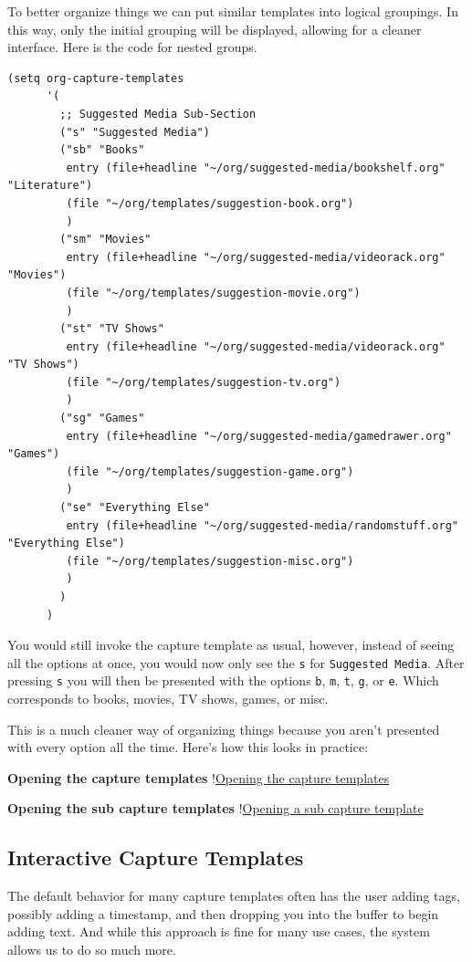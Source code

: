 \documentclass[11pt]{article}
\begin{document}
To better organize things we can put similar templates into logical groupings. In this way, only the initial grouping will be displayed, allowing for a cleaner interface. Here is the code for nested groups.

\begin{verbatim}
(setq org-capture-templates
      '(
        ;; Suggested Media Sub-Section
        ("s" "Suggested Media")
        ("sb" "Books"
         entry (file+headline "~/org/suggested-media/bookshelf.org" "Literature")
         (file "~/org/templates/suggestion-book.org")
         )
        ("sm" "Movies"
         entry (file+headline "~/org/suggested-media/videorack.org" "Movies")
         (file "~/org/templates/suggestion-movie.org")
         )
        ("st" "TV Shows"
         entry (file+headline "~/org/suggested-media/videorack.org" "TV Shows")
         (file "~/org/templates/suggestion-tv.org")
         )
        ("sg" "Games"
         entry (file+headline "~/org/suggested-media/gamedrawer.org" "Games")
         (file "~/org/templates/suggestion-game.org")
         )
        ("se" "Everything Else"
         entry (file+headline "~/org/suggested-media/randomstuff.org" "Everything Else")
         (file "~/org/templates/suggestion-misc.org")
         )
        )
      )
\end{verbatim}

You would still invoke the capture template as usual, however, instead of seeing all the options at once, you would now only see the \texttt{s} for \texttt{Suggested Media}. After pressing \texttt{s} you will then be presented with the options \texttt{b}, \texttt{m}, \texttt{t}, \texttt{g}, or \texttt{e}. Which corresponds to books, movies, TV shows, games, or misc.

This is a much cleaner way of organizing things because you aren't presented with every option all the time. Here's how this looks in practice:

\textbf{Opening the capture templates}
!\href{images/root-capture-templates.png}{Opening the capture templates}

\textbf{Opening the sub capture templates}
!\href{images/sub-capture-templates.png}{Opening a sub capture template}
\subsection*{Interactive Capture Templates}
\label{sec:orga6da0b6}
The default behavior for many capture templates often has the user adding tags, possibly adding a timestamp, and then dropping you into the buffer to begin adding text. And while this approach is fine for many use cases, the system allows us to do so much more.
\end{document}
